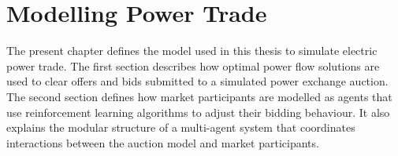 \chapter{Modelling Power Trade}
\label{ch:method}
The present chapter defines the model used in this thesis to simulate electric
power trade. The first section describes how optimal power flow solutions are
used to clear offers and bids submitted to a simulated power exchange auction.
The second section defines how market participants are modelled as agents that
use reinforcement learning algorithms to adjust their bidding behaviour. It
also explains the modular structure of a multi-agent system that coordinates
interactions between the auction model and market participants.

%
%
